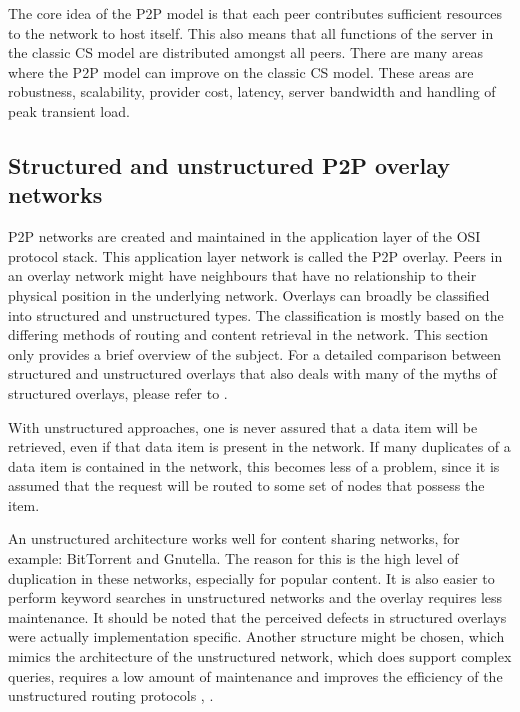 \documentclass[10pt,a4paper,journal,cspaper,compsoc]{IEEEtran}
\begin{document}
The core idea of the \ac{P2P} model is that each peer contributes sufficient resources to the network to host itself. This also means that all
functions of the server in the classic \ac{CS} model are distributed amongst all peers. There are many areas where the \ac{P2P} model can improve on
the classic \ac{CS} model. These areas are robustness, scalability, provider cost, latency, server bandwidth and handling of peak transient load.

\subsection{Structured and unstructured P2P overlay networks}
\label{overlays}

P2P networks are created and maintained in the application layer of the OSI protocol stack. This application layer network is called the P2P overlay.
Peers in an overlay network might have neighbours that have no relationship to their physical position in the underlying network. Overlays can
broadly be classified into structured and unstructured types. The classification is mostly based on the differing methods of routing and content
retrieval in the network. This section only provides a brief overview of the subject. For a detailed comparison between structured and unstructured
overlays that also deals with many of the myths of structured overlays, please refer to \cite{Castro_structured_overlay_myths}.

With unstructured approaches, one is never assured that a data item will be retrieved, even if that data item is present in the network. If many
duplicates of a data item is contained in the network, this becomes less of a problem, since it is assumed that the request will be routed to some
set of nodes that possess the item.

An unstructured architecture works well for content sharing networks, for example: BitTorrent and Gnutella. The reason for this is the high level of
duplication in these networks, especially for popular content. It is also easier to perform keyword searches in unstructured networks and the overlay
requires less maintenance. It should be noted that the perceived defects in structured overlays were actually implementation specific. Another
structure might be chosen, which mimics the architecture of the unstructured network, which does support complex queries, requires a low amount of
maintenance and improves the efficiency of the unstructured routing protocols \cite{Castro_structured_overlay_myths},
\cite{Castro_structured_gnutella}.
\end{document}
